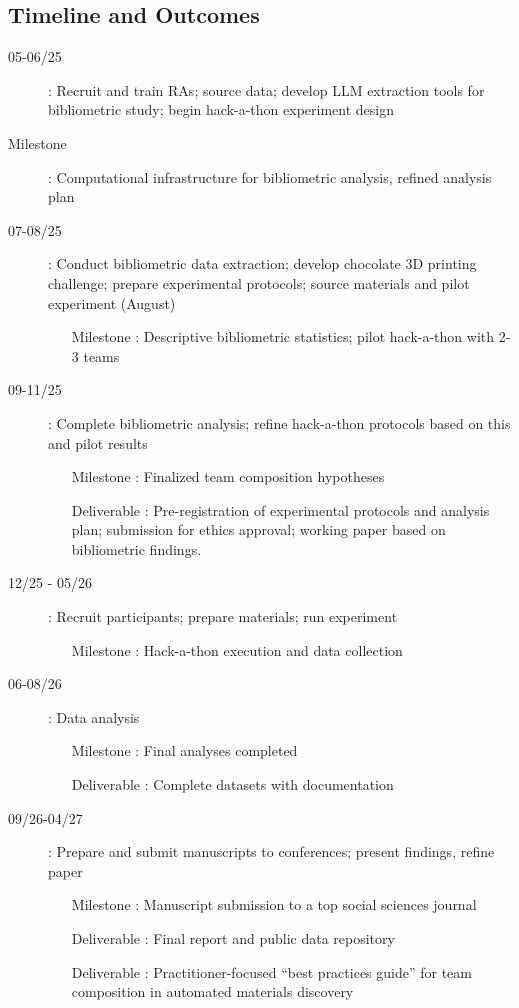\documentclass{article}
\begin{document}
\subsection{Timeline and Outcomes}
\begin{description}
  \item[05-06/25]: Recruit and train RAs; source data; develop LLM extraction tools for bibliometric study; begin hack-a-thon experiment design
  \item[Milestone]: Computational infrastructure for bibliometric analysis, refined analysis plan

  \item[07-08/25]: Conduct bibliometric data extraction; develop chocolate 3D printing challenge; prepare experimental protocols; source materials and pilot experiment (August)
  \begin{itemize}
    \item[Milestone]: Descriptive bibliometric statistics; pilot hack-a-thon with 2-3 teams
  \end{itemize}

  \item[09-11/25]: Complete bibliometric analysis; refine hack-a-thon protocols based on this and pilot results
  \begin{itemize}
    \item[Milestone]: Finalized team composition hypotheses
    \item[Deliverable]: Pre-registration of experimental protocols and analysis plan; submission for ethics approval; working paper based on bibliometric findings.
  \end{itemize}

  \item[12/25 - 05/26]: Recruit participants; prepare materials; run experiment
  \begin{itemize}
    \item[Milestone]: Hack-a-thon execution and data collection
  \end{itemize}

  \item[06-08/26]: Data analysis
  \begin{itemize}
    \item[Milestone]: Final analyses completed
    \item[Deliverable]: Complete datasets with documentation
  \end{itemize}

  \item[09/26-04/27]: Prepare and submit manuscripts to conferences; present findings, refine paper
  \begin{itemize}
    \item[Milestone]: Manuscript submission to a top social sciences journal
    \item[Deliverable]: Final report and public data repository
    \item[Deliverable]: Practitioner-focused “best practices guide” for team composition in automated materials discovery
  \end{itemize}
\end{description}
\newpage
\end{document}
